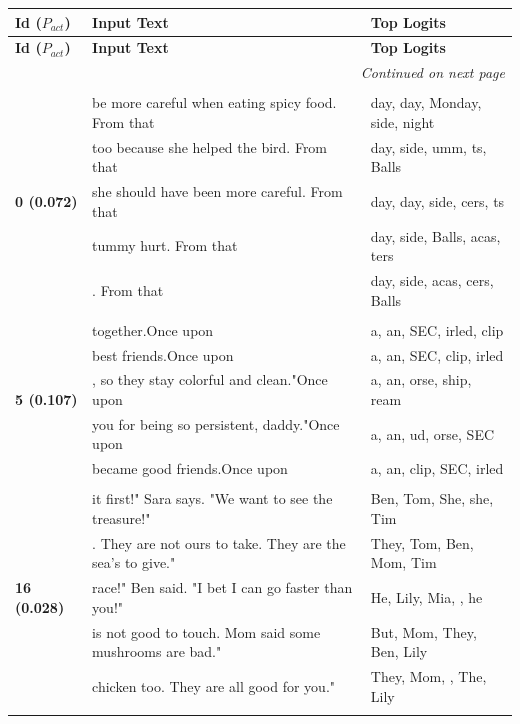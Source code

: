 \documentclass{article}
\theoremstyle{plain}
\theoremstyle{definition}
\theoremstyle{remark}
\begin{document}
\onecolumn
\footnotesize	
\begin{longtable}{|p{}|p{}|p{}|}
\hline
\textbf{Id ($P_{act}$)} & \textbf{Input Text} & \textbf{Top Logits} \\
\hline
\endfirsthead  %
\hline
\textbf{Id ($P_{act}$)} & \textbf{Input Text} & \textbf{Top Logits} \\
\hline
\endhead
\hline
\multicolumn{3}{r}{\textit{Continued on next page}} \\
\hline
\endfoot

\hline
\endlastfoot
& & \\
\multirow{5}{*}{\textbf{0 (0.072)}} & be more careful when eating spicy food. From that & day, day,  Monday, side, night \\
& too because she helped the bird. From that & day, side, umm, ts,  Balls \\
& she should have been more careful. From that & day, day, side, cers, ts \\
& tummy hurt. From that & day, side,  Balls, acas, ters \\
& . From that & day, side, acas, cers,  Balls \\
& & \\
\multirow{5}{*}{\textbf{5 (0.107)}} & together.Once upon & a,  an, SEC, irled, clip \\
& best friends.Once upon & a,  an, SEC, clip, irled \\
& , so they stay colorful and clean."Once upon & a,  an, orse, ship, ream \\
& you for being so persistent, daddy."Once upon & a,  an, ud, orse, SEC \\
& became good friends.Once upon & a,  an, clip, SEC, irled \\
& & \\
\multirow{5}{*}{\textbf{16 (0.028)}} & it first!" Sara says. "We want to see the treasure!" & Ben,  Tom,  She,  she,  Tim \\
& . They are not ours to take. They are the sea's to give." & They,  Tom,  Ben,  Mom,  Tim \\
& race!" Ben said. "I bet I can go faster than you!" & He,  Lily,  Mia,  ,  he \\
& is not good to touch. Mom said some mushrooms are bad." & But,  Mom,  They,  Ben,  Lily \\
& chicken too. They are all good for you." & They,  Mom,  ,  The,  Lily \\
& & \\

\end{longtable}
\end{document}
